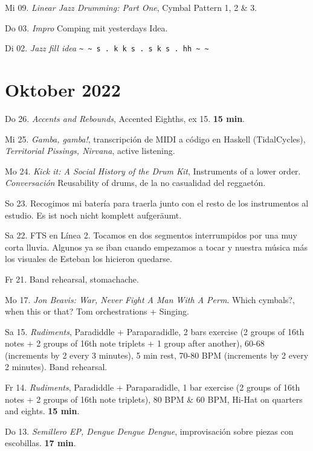\documentclass[
]{book}
\begin{document}
Mi 09. \emph{Linear Jazz Drumming: Part One}, Cymbal Pattern 1, 2 \& 3.

Do 03. \emph{Impro} Comping mit yesterdays Idea.

Di 02. \emph{Jazz fill idea} \texttt{\textasciitilde{}\ \textasciitilde{}\ s\ .\ k\ k\ s\ .\ s\ k\ s\ .\ hh\ \textasciitilde{}\ \textasciitilde{}}

\hypertarget{oktober-2022}{%
\section*{Oktober 2022}\label{oktober-2022}}

Do 26. \emph{Accents and Rebounds}, Accented Eighths, ex 15. \textbf{15 min}.

Mi 25. \emph{Gamba, gamba!}, transcripción de MIDI a código en Haskell (TidalCycles), \emph{Territorial Pissings, Nirvana}, active listening.

Mo 24. \emph{Kick it: A Social History of the Drum Kit}, Instruments of a lower order. \emph{Conversación} Reusability of drums, de la no casualidad del reggaetón.

So 23. Recogimos mi batería para traerla junto con el resto de los instrumentos al estudio. Es ist noch nicht komplett aufgeräumt.

Sa 22. FTS en Línea 2. Tocamos en dos segmentos interrumpidos por una muy corta lluvia. Algunos ya se iban cuando empezamos a tocar y nuestra música más los visuales de Esteban los hicieron quedarse.

Fr 21. Band rehearsal, stomachache.

Mo 17. \emph{Jon Beavis: War, Never Fight A Man With A Perm}. Which cymbals?, when this or that? Tom orchestrations + Singing.

Sa 15. \emph{Rudiments}, Paradiddle + Paraparadidle, 2 bars exercise (2 groups of 16th notes + 2 groups of 16th note triplets + 1 group after another), 60-68 (increments by 2 every 3 minutes), 5 min rest, 70-80 BPM (increments by 2 every 2 minutes). Band rehearsal.

\hypertarget{okt152022}{}

Fr 14. \emph{Rudiments}, Paradiddle + Paraparadidle, 1 bar exercise (2 groups of 16th notes + 2 groups of 16th note triplets), 80 BPM \& 60 BPM, Hi-Hat on quarters and eights. \textbf{15 min}.

Do 13. \emph{Semillero EP, Dengue Dengue Dengue}, improvisación sobre piezas con escobillas. \textbf{17 min}.
\end{document}
